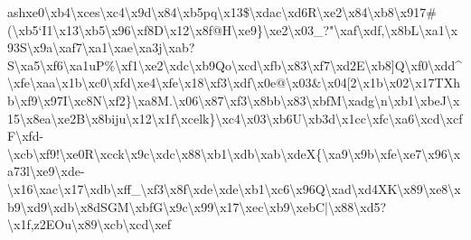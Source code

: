 \documentclass[11pt]{article}
\begin{document}
ash{}xe0\textbackslash{}xb4\textbackslash{}xces\textbackslash{}xc4\textbackslash{}x9d\textbackslash{}x84\textbackslash{}xb5pq\textbackslash{}x13\$\textbackslash{}xdac\textbackslash{}xd6R\textbackslash{}xe2\textbackslash{}x84\textbackslash{}xb8\textbackslash{}x917\#(\textbackslash{}xb5`I1\textbackslash{}x13\textbackslash{}xb5\textbackslash{}x96\textbackslash{}xf8D\textbackslash{}x12\textbackslash{}x8f@H\textbackslash{}xe9\}\textbackslash{}xe2\textbackslash{}x03\_?"\textbackslash{}xaf\textbackslash{}xdf,\textbackslash{}x8bL\textbackslash{}xa1\textbackslash{}x93S\textbackslash{}x9a\textbackslash{}xaf7\textbackslash{}xa1\textbackslash{}xae\textbackslash{}xa3j\textbackslash{}xab?S\textbackslash{}xa5\textbackslash{}xf6\textbackslash{}xa1uP\%\textbackslash{}xf1\textbackslash{}xe2\textbackslash{}xdc\textbackslash{}xb9Qo\textbackslash{}xcd\textbackslash{}xfb\textbackslash{}x83\textbackslash{}xf7\textbackslash{}xd2E\textbackslash{}xb8]Q\textbackslash{}xf0\textbackslash{}xdd\^{}\textbackslash{}xfe\textbackslash{}xaa\textbackslash{}x1b\textbackslash{}xc0\textbackslash{}xfd\textbackslash{}xe4\textbackslash{}xfe\textbackslash{}x18\textbackslash{}xf3\textbackslash{}xdf\textbackslash{}x0e@\textbackslash{}x03\&\textbackslash{}x04[2\textbackslash{}x1b\textbackslash{}x02\textbackslash{}x17TXhb\textbackslash{}xf9\textbackslash{}x97I\textbackslash{}xc8N\textbackslash{}xf2\}\textbackslash{}xa8M.\textbackslash{}x06\textbackslash{}x87\textbackslash{}xf3\textbackslash{}x8bb\textbackslash{}x83\textbackslash{}xbfM\textbackslash{}xadg\textbackslash{}n\textbackslash{}xb1\textbackslash{}xbeJ\textbackslash{}x15\textbackslash{}x8ea\textbackslash{}xe2B\textbackslash{}x8biju\textbackslash{}x12\textbackslash{}x1f\textbackslash{}xcelk\}\textbackslash{}xc4\textbackslash{}x03\textbackslash{}xb6U\textbackslash{}xb3d\textbackslash{}x1cc\textbackslash{}xfc\textbackslash{}xa6\textbackslash{}xcd\textbackslash{}xcfF\textbackslash{}xfd-\textbackslash{}xcb\textbackslash{}xf9!\textbackslash{}xe0R\textbackslash{}xcck\textbackslash{}x9c\textbackslash{}xdc\textbackslash{}x88\textbackslash{}xb1\textbackslash{}xdb\textbackslash{}xab\textbackslash{}xdeX\{\textbackslash{}xa9\textbackslash{}x9b\textbackslash{}xfe\textbackslash{}xe7\textbackslash{}x96\textbackslash{}xa73l\textbackslash{}xe9\textbackslash{}xde-\textbackslash{}x16\textbackslash{}xac\textbackslash{}x17\textbackslash{}xdb\textbackslash{}xff\_\textbackslash{}xf3\textbackslash{}x8f\textbackslash{}xde\textbackslash{}xde\textbackslash{}xb1\textbackslash{}xc6\textbackslash{}x96Q\textbackslash{}xad\textbackslash{}xd4XK\textbackslash{}x89\textbackslash{}xe8\textbackslash{}xb9\textbackslash{}xd9\textbackslash{}xdb\textbackslash{}x8dSGM\textbackslash{}xbfG\textbackslash{}x9c\textbackslash{}x99\textbackslash{}x17\textbackslash{}xec\textbackslash{}xb9\textbackslash{}xebC|\textbackslash{}x88\textbackslash{}xd5?\textbackslash{}x1f,z2EOu\textbackslash{}x89\textbackslash{}xcb\textbackslash{}xcd\textbackslash{}xef 
\end{document}
